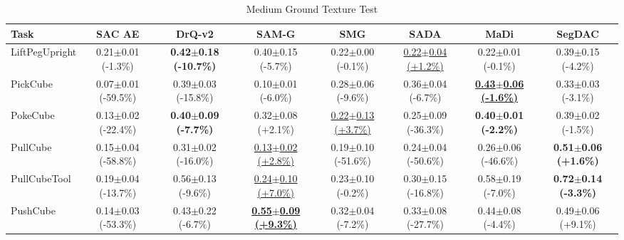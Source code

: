 \begin{table}[htbp]
\centering
\scriptsize
\caption{Medium Ground Texture Test}
\label{tab:appendix_groundtexturetest_medium}
\begin{adjustbox}{max width=\textwidth}
\begin{tabular}{l*{7}{c}}
\toprule
\textbf{Task} & \textbf{SAC AE} & \textbf{DrQ-v2} & \textbf{SAM-G} & \textbf{SMG} & \textbf{SADA} & \textbf{MaDi} & \textbf{SegDAC} \\
\midrule
LiftPegUpright & 0.21$\pm$0.01 \scriptsize{(-1.3\%)} & \textbf{0.42$\pm$0.18 \scriptsize{(-10.7\%)}} & 0.40$\pm$0.15 \scriptsize{(-5.7\%)} & 0.22$\pm$0.00 \scriptsize{(-0.1\%)} & \underline{0.22$\pm$0.04 \scriptsize{(+1.2\%)}} & 0.22$\pm$0.01 \scriptsize{(-0.1\%)} & 0.39$\pm$0.15 \scriptsize{(-4.2\%)} \\
PickCube & 0.07$\pm$0.01 \scriptsize{(-59.5\%)} & 0.39$\pm$0.03 \scriptsize{(-15.8\%)} & 0.10$\pm$0.01 \scriptsize{(-6.0\%)} & 0.28$\pm$0.06 \scriptsize{(-9.6\%)} & 0.36$\pm$0.04 \scriptsize{(-6.7\%)} & \textbf{\underline{0.43$\pm$0.06 \scriptsize{(-1.6\%)}}} & 0.33$\pm$0.03 \scriptsize{(-3.1\%)} \\
PokeCube & 0.13$\pm$0.02 \scriptsize{(-22.4\%)} & \textbf{0.40$\pm$0.09 \scriptsize{(-7.7\%)}} & 0.32$\pm$0.08 \scriptsize{(+2.1\%)} & \underline{0.22$\pm$0.13 \scriptsize{(+3.7\%)}} & 0.25$\pm$0.09 \scriptsize{(-36.3\%)} & \textbf{0.40$\pm$0.01 \scriptsize{(-2.2\%)}} & 0.39$\pm$0.02 \scriptsize{(-1.5\%)} \\
PullCube & 0.15$\pm$0.04 \scriptsize{(-58.8\%)} & 0.31$\pm$0.02 \scriptsize{(-16.0\%)} & \underline{0.13$\pm$0.02 \scriptsize{(+2.8\%)}} & 0.19$\pm$0.10 \scriptsize{(-51.6\%)} & 0.24$\pm$0.04 \scriptsize{(-50.6\%)} & 0.26$\pm$0.06 \scriptsize{(-46.6\%)} & \textbf{0.51$\pm$0.06 \scriptsize{(+1.6\%)}} \\
PullCubeTool & 0.19$\pm$0.04 \scriptsize{(-13.7\%)} & 0.56$\pm$0.13 \scriptsize{(-9.6\%)} & \underline{0.24$\pm$0.10 \scriptsize{(+7.0\%)}} & 0.23$\pm$0.10 \scriptsize{(-0.2\%)} & 0.30$\pm$0.15 \scriptsize{(-16.8\%)} & 0.58$\pm$0.19 \scriptsize{(-7.0\%)} & \textbf{0.72$\pm$0.14 \scriptsize{(-3.3\%)}} \\
PushCube & 0.14$\pm$0.03 \scriptsize{(-53.3\%)} & 0.43$\pm$0.22 \scriptsize{(-6.7\%)} & \textbf{\underline{0.55$\pm$0.09 \scriptsize{(+9.3\%)}}} & 0.32$\pm$0.04 \scriptsize{(-7.2\%)} & 0.33$\pm$0.08 \scriptsize{(-27.7\%)} & 0.44$\pm$0.08 \scriptsize{(-4.4\%)} & 0.49$\pm$0.06 \scriptsize{(+9.1\%)} \\

\end{tabular}
\end{adjustbox}
\end{table}

